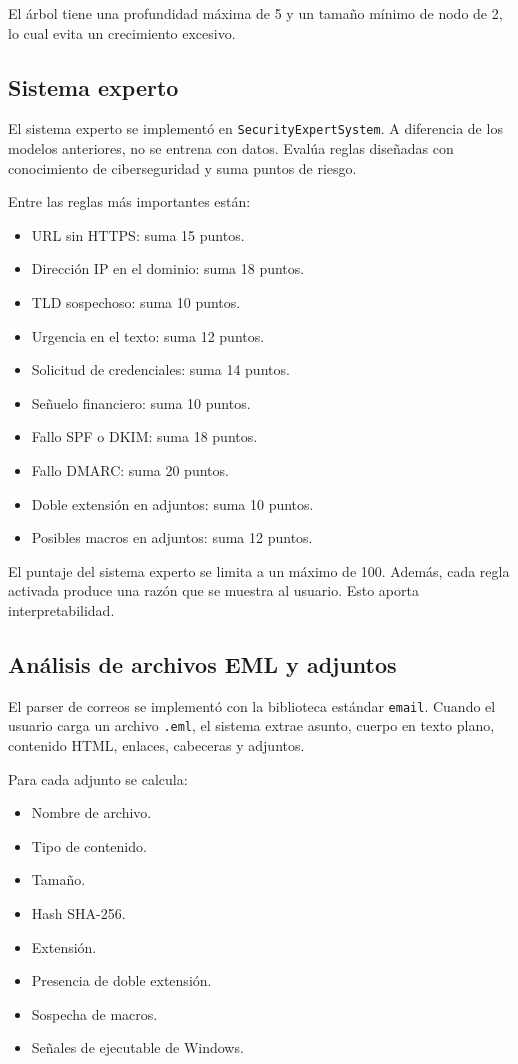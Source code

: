 \documentclass[12pt,letterpaper]{article}
\begin{document}
El árbol tiene una profundidad máxima de 5 y un tamaño mínimo de nodo de 2, lo cual evita un crecimiento excesivo.

\subsection{Sistema experto}

El sistema experto se implementó en \texttt{SecurityExpertSystem}. A diferencia de los modelos anteriores, no se entrena con datos. Evalúa reglas diseñadas con conocimiento de ciberseguridad y suma puntos de riesgo.

Entre las reglas más importantes están:

\begin{itemize}
    \item URL sin HTTPS: suma 15 puntos.
    \item Dirección IP en el dominio: suma 18 puntos.
    \item TLD sospechoso: suma 10 puntos.
    \item Urgencia en el texto: suma 12 puntos.
    \item Solicitud de credenciales: suma 14 puntos.
    \item Señuelo financiero: suma 10 puntos.
    \item Fallo SPF o DKIM: suma 18 puntos.
    \item Fallo DMARC: suma 20 puntos.
    \item Doble extensión en adjuntos: suma 10 puntos.
    \item Posibles macros en adjuntos: suma 12 puntos.
\end{itemize}

El puntaje del sistema experto se limita a un máximo de 100. Además, cada regla activada produce una razón que se muestra al usuario. Esto aporta interpretabilidad.

\subsection{Análisis de archivos EML y adjuntos}

El parser de correos se implementó con la biblioteca estándar \texttt{email}. Cuando el usuario carga un archivo \texttt{.eml}, el sistema extrae asunto, cuerpo en texto plano, contenido HTML, enlaces, cabeceras y adjuntos.

Para cada adjunto se calcula:

\begin{itemize}
    \item Nombre de archivo.
    \item Tipo de contenido.
    \item Tamaño.
    \item Hash SHA-256.
    \item Extensión.
    \item Presencia de doble extensión.
    \item Sospecha de macros.
    \item Señales de ejecutable de Windows.
\end{itemize}
\end{document}
